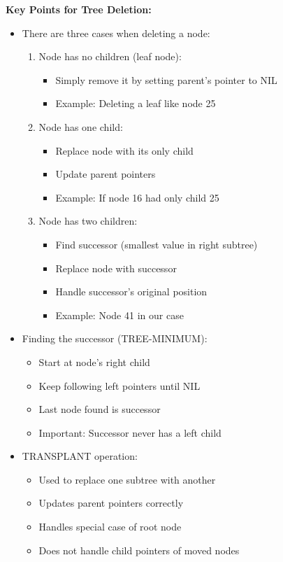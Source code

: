 \textbf{Key Points for Tree Deletion:}
\begin{itemize}
    \item There are three cases when deleting a node:
        \begin{enumerate}
            \item Node has no children (leaf node):
                \begin{itemize}
                    \item Simply remove it by setting parent's pointer to NIL
                    \item Example: Deleting a leaf like node 25
                \end{itemize}
            
            \item Node has one child:
                \begin{itemize}
                    \item Replace node with its only child
                    \item Update parent pointers
                    \item Example: If node 16 had only child 25
                \end{itemize}
            
            \item Node has two children:
                \begin{itemize}
                    \item Find successor (smallest value in right subtree)
                    \item Replace node with successor
                    \item Handle successor's original position
                    \item Example: Node 41 in our case
                \end{itemize}
        \end{enumerate}
    
    \item Finding the successor (TREE-MINIMUM):
        \begin{itemize}
            \item Start at node's right child
            \item Keep following left pointers until NIL
            \item Last node found is successor
            \item Important: Successor never has a left child
        \end{itemize}
    
    \item TRANSPLANT operation:
        \begin{itemize}
            \item Used to replace one subtree with another
            \item Updates parent pointers correctly
            \item Handles special case of root node
            \item Does not handle child pointers of moved nodes
        \end{itemize}
\end{itemize}

